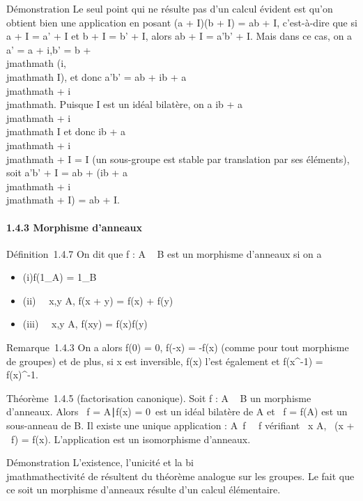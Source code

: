 Démonstration Le seul point qui ne résulte pas d'un calcul évident est
qu'on obtient bien une application en posant (a + I)(b + I) = ab + I,
c'est-à-dire que si a + I = a' + I et b + I = b' + I, alors ab + I =
a'b' + I. Mais dans ce cas, on a a' = a + i,b' = b + \\jmathmath (i,\\jmathmath \in I), et
donc a'b' = ab + ib + a\\jmathmath + i\\jmathmath. Puisque I est un idéal bilatère, on a ib
+ a\\jmathmath + i\\jmathmath \in I et donc ib + a\\jmathmath + i\\jmathmath + I = I (un sous-groupe est stable
par translation par ses éléments), soit a'b' + I = ab + (ib + a\\jmathmath + i\\jmathmath +
I) = ab + I.

\paragraph{1.4.3 Morphisme d'anneaux}

Définition~1.4.7 On dit que f : A \rightarrow~ B est un morphisme d'anneaux si on a

\begin{itemize}
\itemsep1pt\parskip0pt
\item
  (i)f(1_A) = 1_B
\item
  (ii) \forall~~x,y \in A, f(x + y) = f(x) + f(y)
\item
  (iii) \forall~~x,y \in A, f(xy) = f(x)f(y)
\end{itemize}

Remarque~1.4.3 On a alors f(0) = 0, f(-x) = -f(x) (comme pour tout
morphisme de groupes) et de plus, si x est inversible, f(x) l'est
également et f(x^-1) = f(x)^-1.

Théorème~1.4.5 (factorisation canonique). Soit f : A \rightarrow~ B un morphisme
d'anneaux. Alors
\mathrmKer~f =
\x \in A∣f(x) =
0\ est un idéal bilatère de A et
\mathrmIm~f = f(A) est un
sous-anneau de B. Il existe une unique application
\overlinef :
A\diagup\mathrmKer~f
\rightarrow~\mathrmIm~f vérifiant
\forall~x \in A, \overlinef~(x
+ \mathrmKer~f) = f(x).
L'application \overlinef est un isomorphisme
d'anneaux.

Démonstration L'existence, l'unicité et la bi\\jmathmathectivité de
\overlinef résultent du théorème analogue sur les
groupes. Le fait que ce soit un morphisme d'anneaux résulte d'un calcul
élémentaire.


